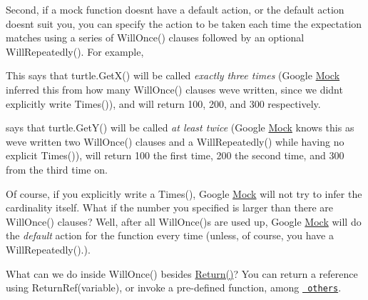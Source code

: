 Second, if a mock function doesn\textquotesingle{}t have a default action, or the default action doesn\textquotesingle{}t suit you, you can specify the action to be taken each time the expectation matches using a series of {\ttfamily Will\+Once()} clauses followed by an optional {\ttfamily Will\+Repeatedly()}. For example,


\begin{DoxyCode}{0}
\end{DoxyCode}


This says that {\ttfamily turtle.\+Get\+X()} will be called {\itshape exactly three times} (Google \mbox{\hyperlink{class_mock}{Mock}} inferred this from how many {\ttfamily Will\+Once()} clauses we\textquotesingle{}ve written, since we didn\textquotesingle{}t explicitly write {\ttfamily Times()}), and will return 100, 200, and 300 respectively.


\begin{DoxyCode}{0}
\end{DoxyCode}


says that {\ttfamily turtle.\+Get\+Y()} will be called {\itshape at least twice} (Google \mbox{\hyperlink{class_mock}{Mock}} knows this as we\textquotesingle{}ve written two {\ttfamily Will\+Once()} clauses and a {\ttfamily Will\+Repeatedly()} while having no explicit {\ttfamily Times()}), will return 100 the first time, 200 the second time, and 300 from the third time on.

Of course, if you explicitly write a {\ttfamily Times()}, Google \mbox{\hyperlink{class_mock}{Mock}} will not try to infer the cardinality itself. What if the number you specified is larger than there are {\ttfamily Will\+Once()} clauses? Well, after all {\ttfamily Will\+Once()}s are used up, Google \mbox{\hyperlink{class_mock}{Mock}} will do the {\itshape default} action for the function every time (unless, of course, you have a {\ttfamily Will\+Repeatedly()}.).

What can we do inside {\ttfamily Will\+Once()} besides {\ttfamily \mbox{\hyperlink{namespacetesting_adae3994eb444d1ad2dd602454b854663}{Return()}}}? You can return a reference using {\ttfamily Return\+Ref(variable)}, or invoke a pre-\/defined function, among \href{CheatSheet.md\#actions}{\texttt{ others}}.

